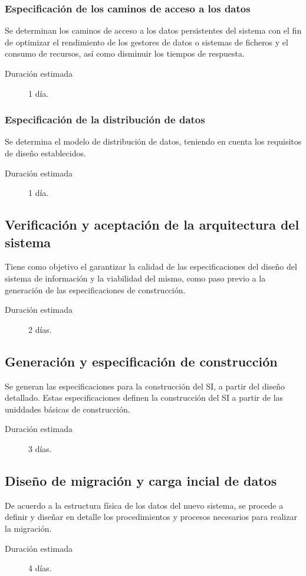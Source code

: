 \documentclass[11pt,a4paper,spanish,twoside]{report}
\begin{document}
\subsubsection{Especificación de los caminos de acceso a los datos}
Se determinan los caminos de acceso a los datos persistentes del sistema con
el fin de optimizar el rendimiento de los gestores de datos o sistemas de
ficheros y el consumo de recursos, así como disminuir los tiempos de
respuesta. 
\begin{description}
\item[Duración estimada] 1 día.
\end{description}

\subsubsection{Especificación de la distribución de datos}
Se determina el modelo de distribución de datos, teniendo en cuenta los
requisitos de diseño establecidos. 
\begin{description}
\item[Duración estimada] 1 día.
\end{description}

\subsection{Verificación y aceptación de la arquitectura del sistema}
Tiene como objetivo el garantizar la calidad de las especificaciones del
diseño del sistema de información y la viabilidad del mismo, como paso previo
a la generación de las especificaciones de construcción. 
\begin{description}
\item[Duración estimada] 2 días.
\end{description}

\subsection{Generación y especificación de construcción}
Se generan las especificaciones para la construcción del SI, a partir del
diseño detallado. Estas especificaciones definen la construcción del SI a
partir de las uniddades básicas de construcción. 
\begin{description}
\item[Duración estimada] 3 días.
\end{description}

\subsection{Diseño de migración y carga incial de datos}
De acuerdo a la estructura física de los datos del nuevo sistema, se procede
a definir y diseñar en detalle los procedimientos y procesos necesarios para
realizar la migración. 
\begin{description}
\item[Duración estimada] 4 días.
\end{description}
\end{document}
